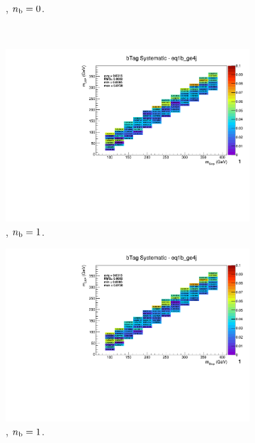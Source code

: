 \begin{figure}[ht!]
\begin{subfigure}[b]{0.32\textwidth}
    \caption{\njhigh, $n_{\text{b}} = 0$.}
  \end{subfigure}\\
  \begin{subfigure}[b]{0.32\textwidth}
    \includegraphics[width=\textwidth, page=12]{Figs/sms/t2degen/v19_2/systs/T2_4body_bTag_eq1b_ge4j.pdf}
    \caption{\njhigh, $n_{\text{b}} = 1$.}
  \end{subfigure}
  \begin{subfigure}[b]{0.32\textwidth}
    \includegraphics[width=\textwidth, page=8]{Figs/sms/t2degen/v19_2/systs/T2_4body_bTag_eq1b_ge4j.pdf}
    \caption{\njhigh, $n_{\text{b}} = 1$.}
  \end{subfigure}
  \begin{subfigure}[b]{0.32\textwidth}

\end{subfigure}
\end{figure}
